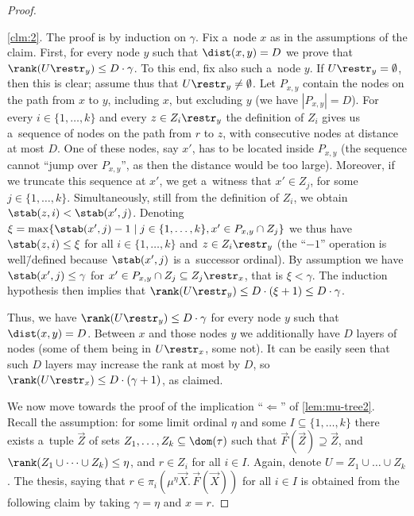 \documentclass{lmcs}
\numberwithin{equation}{section}
\numberwithin{figure}{section}
\begin{document}
\begin{proof}
	\begin{proofof}{\cref{clm:2}.}
		The proof is by induction on $\gamma$.
		Fix a~node $x$ as in the assumptions of the claim.
		First, for every node $y$ such that $\dist(x,y)=D$ we prove that $\rank(U\restr_y)\leq D\cdot\gamma$.
		To this end, fix also such a~node $y$.
		If $U\restr_y=\emptyset$, then this is clear; assume thus that $U\restr_y\neq\emptyset$.
		Let $P_{x,y}$ contain the nodes on the path from $x$ to $y$, including $x$, but excluding $y$ (we have $|P_{x,y}|=D$).
		For every $i\in\{1,\dots,k\}$ and every $z\in Z_i\restr_y$ the definition of $Z_i$ gives us a~sequence of nodes on the path from $r$ to $z$, with consecutive nodes at distance at most $D$.
		One of these nodes, say $x'$, has to be located inside $P_{x,y}$ (the sequence cannot ``jump over $P_{x,y}$'', as then the distance would be too large).
		Moreover, if we truncate this sequence at $x'$, we get a~witness that $x'\in Z_j$, for some $j\in\{1,\dots,k\}$.
		Simultaneously, still from the definition of $Z_i$, we obtain $\stab(z,i)<\stab(x',j)$.
		Denoting $\xi=\max\{\stab(x',j)-1\mid j\in\{1,\dots,k\},x'\in P_{x,y}\cap Z_j\}$ we thus have $\stab(z,i)\leq\xi$ for all $i\in\{1,\dots,k\}$ and $z\in Z_i\restr_y$
		(the ``$-1$'' operation is well\=/defined because $\stab(x',j)$ is a~successor ordinal).
		By assumption we have $\stab(x',j)\leq\gamma$ for $x'\in P_{x,y}\cap Z_j\subseteq Z_j\restr_x$, that is $\xi<\gamma$.
		The induction hypothesis then implies that $\rank(U\restr_y)\leq D\cdot(\xi+1)\leq D\cdot\gamma$.

		Thus, we have $\rank(U\restr_y)\leq D\cdot\gamma$ for every node $y$ such that $\dist(x,y)=D$.
		Between $x$ and those nodes $y$ we additionally have $D$ layers of nodes (some of them being in $U\restr_x$, some not).
		It can be easily seen that such $D$ layers may increase the rank at most by $D$, so $\rank(U\restr_x)\leq D\cdot(\gamma+1)$, as claimed.
	\end{proofof}
	
	We now move towards the proof of the implication ``$\Leftarrow$'' of \cref{lem:mu-tree2}.
	Recall the assumption: for some limit ordinal $\eta$ and some $I\subseteq\{1,\dots,k\}$
	there exists a~tuple $\vec{Z}$ of sets $Z_1,\dots,Z_k\subseteq\dom(\tau)$ such that $\vec{F}(\vec{Z})\supseteq\vec{Z}$, and $\rank(Z_1\cup\dots\cup Z_k)\leq\eta$, and $r\in Z_i$ for all $i\in I$.
	Again, denote $U=Z_1\cup\dots\cup Z_k$.
	The thesis, saying that $r\in\pi_i(\mu^\eta\vec{X}.\,\vec{F}(\vec{X}))$ for all $i\in I$ is obtained from the following claim by taking $\gamma=\eta$ and $x=r$.


\end{proof}
\end{document}
